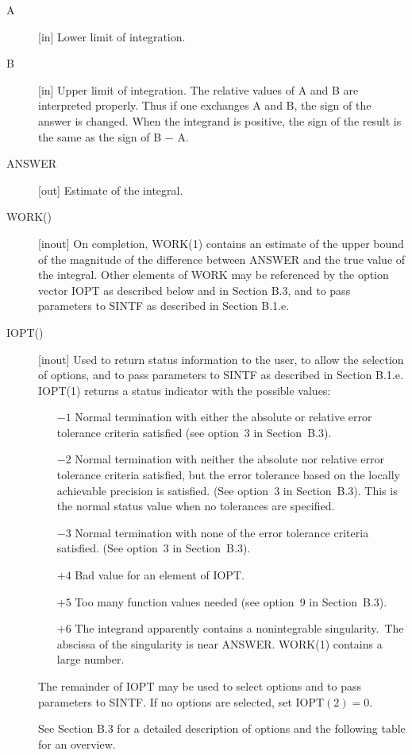 \documentclass[twoside]{MATH77}
\begin{document}
\begin{description}
\item[A]  [in] Lower limit of integration.

\item[B]  [in] Upper limit of integration. The relative values of A and B
are interpreted properly.  Thus if one exchanges A and B, the sign of
the answer is changed.  When the integrand is positive, the sign of
the result is the same as the sign of B $-$ A.

\item[ANSWER]  [out] Estimate of the integral.

\item[WORK()]  [inout] On completion, WORK(1) contains an estimate of the
upper bound of the magnitude of the difference between ANSWER and the
true value of the integral. Other elements of WORK may be referenced by
the option vector IOPT as described below and in Section B.3, and to pass
parameters to SINTF as described in Section B.1.e.

\item[IOPT()]  [inout] Used to return status information to the user, to
allow the selection of options, and to pass parameters to SINTF as described
in Section B.1.e. IOPT(1) returns a status indicator with the possible
values:

\begin{itemize}
\item[$-1$]  Normal termination with either the absolute or relative error
tolerance criteria satisfied (see option~3 in Section~B.3).

\item[$-2$]  Normal termination with neither the absolute nor relative error
tolerance criteria satisfied, but the error tolerance based on the locally
achievable precision is satisfied. (See option~3 in Section~B.3).
This is the normal status value when no tolerances are specified.

\item[$-3$]  Normal termination with none of the error tolerance criteria
satisfied. (See option~3 in Section~B.3).
\item[$+4$]  Bad value for an element of IOPT.

\item[$+5$]  Too many function values needed (see option~9 in
Section~B.3).

\item[$+6$]  The integrand apparently contains a nonintegrable singularity.\
The abscissa of the singularity is near ANSWER. WORK(1) contains a large
number.
\end{itemize}

The remainder of IOPT may be used to select options and to pass parameters
to SINTF. If no options are selected, set IOPT$(2)=0.$

See Section B.3 for a detailed description of options and the following
table for an overview.
\end{description}
\end{document}
